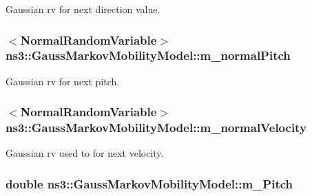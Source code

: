 Gaussian rv for next direction value. 

\subsubsection[{\texorpdfstring{m\+\_\+normal\+Pitch}{m_normalPitch}}]{$<${\bf Normal\+Random\+Variable}$>$ ns3\+::\+Gauss\+Markov\+Mobility\+Model\+::m\+\_\+normal\+Pitch\hspace{0.3cm}{\ttfamily [private]}}\hypertarget{classns3_1_1GaussMarkovMobilityModel_a1563f603818a75cfd2bd92e0852b3c8e}{}\label{classns3_1_1GaussMarkovMobilityModel_a1563f603818a75cfd2bd92e0852b3c8e}


Gaussian rv for next pitch. 

\subsubsection[{\texorpdfstring{m\+\_\+normal\+Velocity}{m_normalVelocity}}]{$<${\bf Normal\+Random\+Variable}$>$ ns3\+::\+Gauss\+Markov\+Mobility\+Model\+::m\+\_\+normal\+Velocity\hspace{0.3cm}{\ttfamily [private]}}\hypertarget{classns3_1_1GaussMarkovMobilityModel_a68773ff0fbf46d9690a0b7b9a85f49ee}{}\label{classns3_1_1GaussMarkovMobilityModel_a68773ff0fbf46d9690a0b7b9a85f49ee}


Gaussian rv used to for next velocity. 

\subsubsection[{\texorpdfstring{m\+\_\+\+Pitch}{m_Pitch}}]{\setlength{\rightskip}{0pt plus 5cm}double ns3\+::\+Gauss\+Markov\+Mobility\+Model\+::m\+\_\+\+Pitch\hspace{0.3cm}{\ttfamily [private]}}\hypertarget{classns3_1_1GaussMarkovMobilityModel_a0703ff7bcbeae86ef3e58284f20a6517}{}\label{classns3_1_1GaussMarkovMobilityModel_a0703ff7bcbeae86ef3e58284f20a6517}


